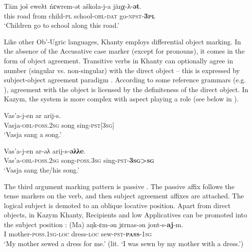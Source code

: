 \documentclass[output=paper]{langscibook}
\begin{document}
\ea 
\label{ex:Volkova:5}
 \gll Tăm još eweλt ńɛwrem-ət aškola-j-a jăŋχ-λ-\textbf{ət}.\\
 this road from child\textsc{{}-pl} school\textsc{{}-obl-dat} go\textsc{{}-npst-}\textbf{\textsc{3pl}}\\
 \glt ‘Children go to school along this road.’
\z

 
Like other Ob’-Ugric languages, Khanty employs differential object marking. In the absence of the Accusative case marker (except for pronouns), it comes in the form of object agreement. Transitive verbs in Khanty can optionally agree in number (singular vs. non-singular) with the direct object – this is expressed by subject-object agreement paradigm . According to some reference grammars (e.g. \citealt{Honti1984}), agreement with the object is licensed by the definiteness of the direct object. In Kazym, the system is more complex with aspect playing a role (see below in ).

\ea 
\label{ex:Volkova:6}
	\ea
	\label{ex:Volkova:6a}
  	 \gll Vas’a-j-en ar arij-s.\\
  	 Vasja\textsc{{}-obl-poss.2sg} song sing\textsc{{}-pst[3sg]}\\
  	 \glt ‘Vasja sang a song.’

	\ex
	\label{ex:Volkova:6b}
  	 \gll Vas’a-j-en ar-əλ arij-s-\textbf{əλλe}.\\
  	 Vas’a\textsc{{}-obl-poss.2sg} song\textsc{{}-poss.3sg} sing\textsc{{}-pst-}\textbf{\textsc{3sg>sg}}\\
  	 \glt ‘Vasja sang the/his song.’
	\z
\z

The third argument marking pattern is passive . The passive affix follows the tense markers on the verb, and then subject agreement affixes are attached. The logical subject is demoted to an oblique locative position. Apart from direct objects, in Kazym Khanty, Recipients and low Applicatives  can be promoted into the subject position \citep{Nikolaeva1999Ostyak,ColleyPrivoznov2019}:
\ea 
\label{ex:Volkova:7}
 \gll (Ma) aŋk-ɛm-ən jɛrnas-ən jont-s-\textbf{aj}{}-m.\\
 I mother\textsc{{}-poss.1sg-loc} dress{}-\textsc{loc} sew\textsc{{}-pst-}\textbf{\textsc{pass}}\textsc{{}-1sg} \\
 \glt ‘My mother sewed a dress for me.’ (lit. ‘I was sewn by my mother with a dress.’)
\z


%
\end{document}
